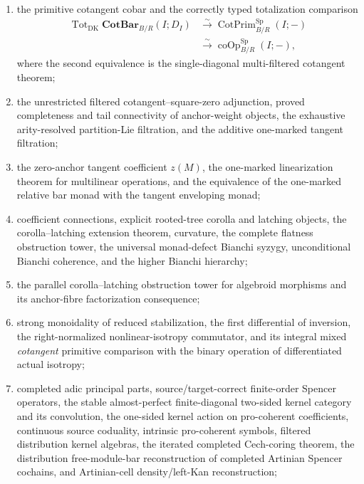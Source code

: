 \begin{theorem}
\begin{enumerate}
    \item the primitive cotangent cobar and the correctly typed totalization
    comparison
    \[
    \boxed{
    \begin{aligned}
        \operatorname{Tot}_{\mathrm{DK}}\mathbf{CotBar}_{B/R}(I;D_I)
        &\xrightarrow{\sim}
        \operatorname{CotPrim}^{\mathrm{Sp}}_{B/R}(I;-)\\
        &\xrightarrow{\sim}
        \operatorname{coOp}^{\mathrm{Sp}}_{B/R}(I;-),
    \end{aligned}}
    \]
    where the second equivalence is the single-diagonal multi-filtered
    cotangent theorem;

    \item the unrestricted filtered cotangent--square-zero adjunction, proved
    completeness and tail connectivity of anchor-weight objects, the
    exhaustive arity-resolved partition-Lie filtration, and the additive
    one-marked tangent filtration;

    \item the zero-anchor tangent coefficient $z(M)$, the one-marked
    linearization theorem for multilinear operations, and the equivalence of
    the one-marked relative bar monad with the tangent enveloping monad;

    \item coefficient connections, explicit rooted-tree corolla and latching
    objects, the corolla--latching extension theorem, curvature, the complete
    flatness obstruction tower, the universal monad-defect Bianchi syzygy,
    unconditional Bianchi coherence, and the higher Bianchi hierarchy;

    \item the parallel corolla--latching obstruction tower for algebroid
    morphisms and its anchor-fibre factorization consequence;

    \item strong monoidality of reduced stabilization, the first differential
    of inversion, the right-normalized nonlinear-isotropy commutator, and its
    integral mixed \emph{cotangent} primitive comparison with the binary
    operation of differentiated actual isotropy;

    \item completed adic principal parts, source/target-correct finite-order
    Spencer operators, the stable almost-perfect finite-diagonal two-sided
    kernel category and its convolution, the one-sided kernel action on
    pro-coherent coefficients, continuous source coduality, intrinsic
    pro-coherent symbols, filtered distribution kernel algebras, the iterated
    completed Cech-coring theorem, the distribution free-module-bar
    reconstruction of completed Artinian Spencer cochains, and Artinian-cell
    density/left-Kan reconstruction;


\end{enumerate}
\end{theorem}
